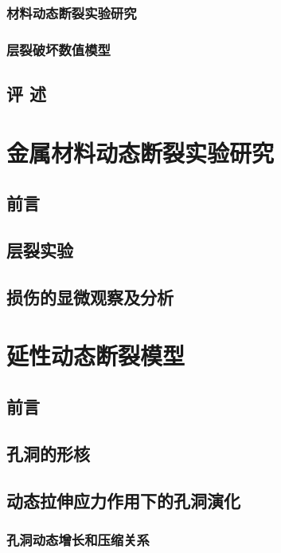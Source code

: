 \documentclass[degree=postdoc]{sysuthesis}
\begin{document}
\clearpage
\setcounter{page}{41}
\subsection{材料动态断裂实验研究}
\subsection{层裂破坏数值模型}
\section{评  述}

\clearpage
\setcounter{page}{51}
\chapter{金属材料动态断裂实验研究}
\section{前言}

\clearpage
\setcounter{page}{52}
\section{层裂实验}

\clearpage
\setcounter{page}{83}
\section{损伤的显微观察及分析}
\chapter{延性动态断裂模型}
\section{前言}

\clearpage
\setcounter{page}{84}
\section{孔洞的形核}

\clearpage
\setcounter{page}{86}
\section{动态拉伸应力作用下的孔洞演化}
\subsection{孔洞动态增长和压缩关系}
\end{document}
